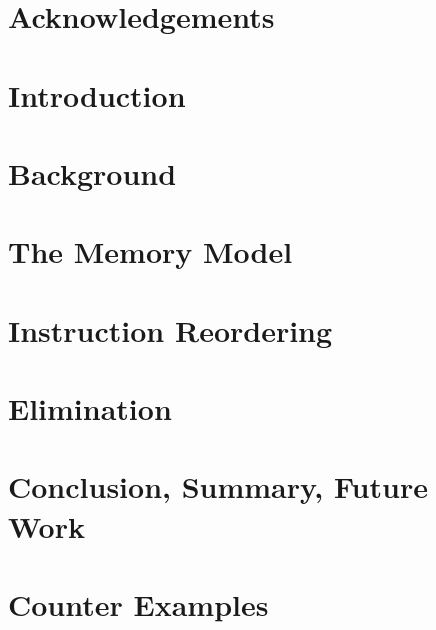 \documentclass[12pt, TexShade, letterpaper]{report}
\begin{document}
\chapter*{Acknowledgements}
	\label{chap:acknowledgments}
    

 \tableofcontents\thispagestyle{plain}

 \listoffigures\thispagestyle{plain}

\clearpage

    \chapter{Introduction}
    

    \chapter{Background}
    

    \chapter{The Memory Model}
    

    \chapter{Instruction Reordering}
    

    \chapter{Elimination} 
    

    \chapter{Conclusion, Summary, Future Work}
    
    
    \printbibliography

    \appendix 

    \chapter{Counter Examples}
    
\end{document}
